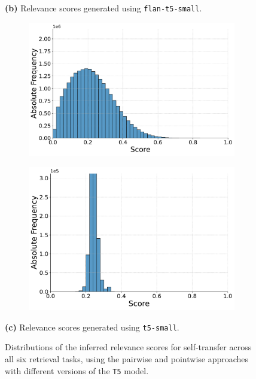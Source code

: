 \begin{figure}[t!]
    \vspace{-0.5cm}
    \textbf{(b)} Relevance scores generated using \texttt{flan-t5-small}.
    \vspace{0.5cm}

    \begin{subfigure}[b]{0.49\textwidth}
        \centering
        \includegraphics[width=\textwidth]{graphics/seaborn/pairwise_self_score_distribution_t5-small.pdf}
        \label{fig:pairwise_t5-small}
    \end{subfigure}
    \hfill
    \begin{subfigure}[b]{0.49\textwidth}
        \centering
        \includegraphics[width=\textwidth]{graphics/seaborn/pointwise_self_score_distribution_t5-small.pdf}
        \label{fig:pointwise_t5-small}
    \end{subfigure}

    \vspace{-0.5cm}
    \textbf{(c)} Relevance scores generated using \texttt{t5-small}.
    \vspace{0.5cm}

    \caption{Distributions of the inferred relevance scores for self-transfer across all six retrieval tasks, using the pairwise and pointwise approaches with different versions of the \texttt{T5} model.}
    \label{fig:score-distributions}
\end{figure}
